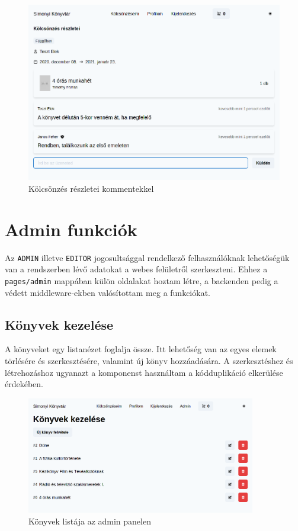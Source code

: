 \begin{figure}[!ht]
  \centering
  \includegraphics[width=150mm, keepaspectratio]{figures/order-detail.png}
  \caption{Kölcsönzés részletei kommentekkel}
  \label{fig:OrderDetail}
\end{figure}


\section{Admin funkciók}

Az \lstinline|ADMIN| illetve \lstinline|EDITOR| jogosultsággal rendelkező felhasználóknak lehetőségük van a rendszerben
lévő adatokat a webes felületről szerkeszteni. Ehhez a \lstinline|pages/admin| mappában külön oldalakat hoztam létre,
a backenden pedig a védett middleware-ekben valósítottam meg a funkciókat.

\subsection{Könyvek kezelése}

A könyveket egy listanézet foglalja össze. Itt lehetőség van az egyes elemek törlésére és szerkesztésére, valamint új
könyv hozzáadására. A szerkesztéshez és létrehozáshoz ugyanazt a komponenst használtam a kódduplikáció elkerülése érdekében.

\begin{figure}[!ht]
  \centering
  \includegraphics[width=100mm, keepaspectratio]{figures/book-admin-list.png}
  \caption{Könyvek listája az admin panelen}
  \label{fig:BookAdminList}
\end{figure}

